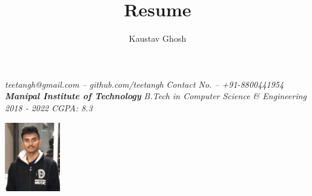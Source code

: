 \documentclass{article}
\makeatletter
\renewcommand{\maketitle}{
    \begin{flushleft}        
        {\huge\rmfamily
        \theauthor}\newline
        \vspace{0.1em}
        \textit{teetangh@gmail.com -- github.com/teetangh}\newline
        \textit{Contact No. -- +91-8800441954}\newline
        \textbf{\emph{Manipal Institute of Technology}}\newline
        \textit{B.Tech in Computer Science \& Engineering}
        \textit{2018 - 2022}\newline
        \textit{CGPA: 8.3}\newline
    \end{flushleft}

}
\makeatother
\begin{document}
\thispagestyle{empty}  %

    


\begin{multicols}{2}
    \title{Resume}
        \author{Kaustav Ghosh}
    \maketitle
    \begin{flushright}
        \includegraphics[height=3cm]{kaustav2.jpeg}
    \end{flushright}
\end{multicols}
\end{document}
